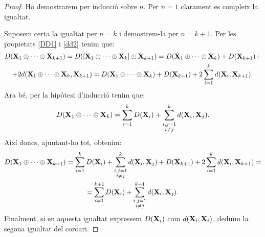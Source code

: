 \documentclass{article}
\theoremstyle{math}
\theoremstyle{TheoremNum}
\newcommand{\0}{\ensuremath{\vb{0}}}
\newcommand{\X}{\ensuremath{\vb{X}}}
\begin{document}
\begin{proof}
  Ho demostrarem per inducció sobre $n$. Per $n=1$ clarament es compleix la igualtat.\par
  \noindent Suposem certa la igualtat per $n=k$ i demostrem-la per $n=k+1$. Per les propietats \ref{DD1} i \ref{dd2} tenim que:
  \begin{multline*}
    D(\X_1\oplus\cdots\oplus\X_{k+1})=D([\X_1\oplus\cdots\oplus\X_k]\oplus\X_{k+1})=D(\X_1\oplus\cdots\oplus\X_k)+D(\X_{k+1})+\\+2d(\X_1\oplus\cdots\oplus\X_k,\X_{k+1})=D(\X_1\oplus\cdots\oplus\X_k)+D(\X_{k+1})+2\sum_{i=1}^kd(\X_i,\X_{k+1}).
  \end{multline*}
  Ara bé, per la hipòtesi d'inducció tenim que:
  $$D(\X_1\oplus\cdots\oplus\X_k)=\sum_{i=1}^kD(\X_i)+\sum_{\substack{i,j=1\\i\ne j}}^kd(\X_i,\X_j).$$
  Així doncs, ajuntant-ho tot, obtenim:
  \begin{multline*}
    D(\X_1\oplus\cdots\oplus\X_{k+1})=\sum_{i=1}^kD(\X_i)+\sum_{\substack{i,j=1\\i\ne j}}^kd(\X_i,\X_j)+D(\X_{k+1})+2\sum_{i=1}^kd(\X_i,\X_{k+1})=\\=\sum_{i=1}^{k+1}D(\X_i)+\sum_{\substack{i,j=1\\i\ne j}}^{k+1}d(\X_i,\X_j).
  \end{multline*}
  Finalment, si en aquesta igualtat expressem $D(\X_i)$ com $d(\X_i,\X_i)$, deduïm la segona igualtat del coro\lgem ari.
\end{proof}
\end{document}
